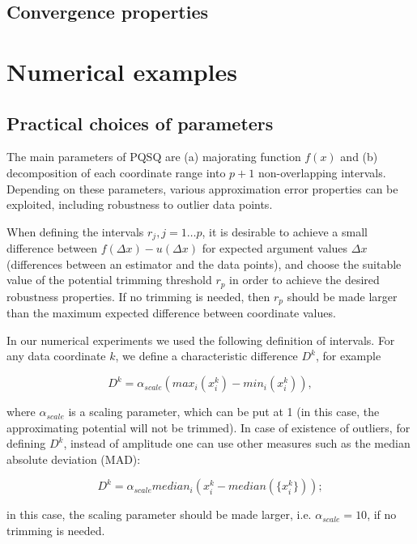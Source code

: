 \documentclass[preprint,12pt]{elsarticle}
\begin{document}
\subsection{Convergence properties}


\section{Numerical examples}

\subsection{Practical choices of parameters}

The main parameters of PQSQ are (a) majorating function $f(x)$ and (b) decomposition of each coordinate range into $p+1$ non-overlapping intervals.
Depending on these parameters, various approximation error properties can be exploited, including robustness to outlier data points.

When defining the intervals $r_j, j=1\dots p$, it is desirable to achieve a small difference between $f(\Delta x)-u(\Delta x)$ for expected argument values $\Delta x$ (differences between an estimator and the data points), and choose the suitable value of the potential trimming threshold $r_p$ in order to achieve the desired robustness properties. If no trimming is needed, then $r_p$ should be made larger than the maximum expected difference between coordinate values.

In our numerical experiments we used the following definition of intervals. For any data coordinate $k$, we define a characteristic difference $D^k$, for example

\begin{equation}\label{characteristic_distance_amplitude}
D^k = \alpha_{scale}(max_i(x_i^k)-min_i(x_i^k)),
\end{equation}

\noindent where $\alpha_{scale}$ is a scaling parameter, which can be put at 1 (in this case, the approximating potential will not be trimmed). In case of existence of outliers, for defining $D^k$, instead of amplitude one can use other measures such as the median absolute deviation (MAD):

\begin{equation}\label{characteristic_distance_mad}
D^k = \alpha_{scale}median_i(x_i^k-median(\{x_i^k\}));
\end{equation}

\noindent in this case, the scaling parameter should be made larger, i.e. $\alpha_{scale}=10$, if no trimming is needed.
\end{document}
